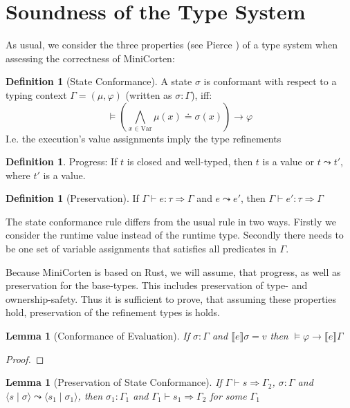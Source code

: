 \documentclass{book}
\newcommand{\tuple}[2]{\langle #1 \mid #2 \rangle}
\newcommand{\bbracket}[1]{\llbracket #1 \rrbracket}
\newtheorem{lemma}[theorem]{Lemma}
\theoremstyle{definition}
\newtheorem{definition}[theorem]{Definition}
\begin{document}
\section{Soundness of the Type System}

As usual, we consider the three properties (see Pierce \cite[p. 95, p.167]{pierce_types_2002}) of a type system when assessing the correctness of MiniCorten:

\begin{definition}[State Conformance]
  A state $\sigma$ is conformant with respect to a typing context $\Gamma = (\mu, \varphi)$ (written as $\sigma : \Gamma$), iff:
  $$\vDash \left(\bigwedge_{x \in \text{Var}} \mu(x) \doteq \sigma(x)\right) \to \varphi$$
   I.e. the execution's value assignments imply the type refinements
\end{definition}

\begin{definition}
  Progress:
    If $t$ is closed and well-typed, then $t$ is a value or $t \leadsto t'$, where $t'$ is a value.
\end{definition}

\begin{definition}[Preservation]
  If $\Gamma \vdash e : \tau \Rightarrow \Gamma$ and $e \leadsto e'$, then $\Gamma \vdash e' : \tau \Rightarrow \Gamma$
\end{definition}

The state conformance rule differs from the usual rule in two ways. Firstly we consider the runtime value instead of the runtime type. Secondly there needs to be one set of variable assignments that satisfies all predicates in $\Gamma$.

Because MiniCorten is based on Rust, we will assume, that progress, as well as preservation for the base-types. This includes preservation of type- and ownership-safety. Thus it is sufficient to prove, that assuming these properties hold, preservation of the refinement types is holds.


\begin{lemma}[Conformance of Evaluation]
  If $\sigma : \Gamma$ and $\bbracket{e} \sigma = v$ then $\vDash \varphi \to \bbracket{e} \Gamma$ 
\end{lemma}
\begin{proof}
  
\end{proof}


\begin{lemma}[Preservation of State Conformance]
  If $\Gamma \vdash s \Rightarrow \Gamma_2$, $\sigma : \Gamma$ and $\tuple{s}{\sigma} \leadsto \tuple{s_1}{\sigma_1}$, then  $\sigma_1 : \Gamma_1$ and $\Gamma_1 \vdash s_1 \Rightarrow \Gamma_2$ for some $\Gamma_1$
\end{lemma}
\end{document}
